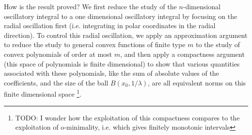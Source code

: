 

	How is the result proved? We first reduce the study of the $n$-dimensional oscillatory integral to a one dimensional oscillatory integral by focusing on the radial oscillation first (i.e. integrating in polar coordinates in the radial direction). To control this radial oscillation, we apply an approximation argument to reduce the study to general convex functions of finite type $m$ to the study of convex polynomials of order at most $m$, and then apply a compactness argument (this space of polynomials is finite dimensional) to show that various quantities associated with these polynomials, like the sum of absolute values of the coefficients, and the size of the ball $B(x_0,1/\lambda)$, are all equivalent norms on this finite dimensional space \footnote{TODO: I wonder how the exploitation of this compactness compares to the exploitation of o-minimality, i.e. which gives finitely monotonic intervals}.



